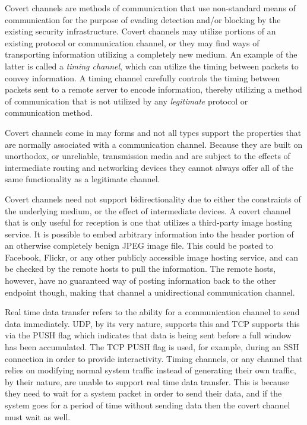 \documentclass[12pt]{article}
\theoremstyle{remark}
\theoremstyle{definition}
\theoremstyle{definition}
\theoremstyle{definition}
\begin{document}
Covert channels are methods of communication that use non-standard means of
communication for the purpose of evading detection and/or blocking by the
existing security infrastructure. Covert channels may utilize
portions of an existing protocol or communication channel, or they may find
ways of transporting information utilizing a completely new medium. An example
of the latter is called a \emph{timing channel}, which can utilize the timing
between packets to convey information. A timing channel carefully controls the
timing between packets sent to a remote server to encode information, thereby
utilizing a method of communication that is not utilized by any
\emph{legitimate} protocol or communication method.

Covert channels come in may forms and not all types support the properties that
are normally associated with a communication channel. Because they are built on
unorthodox, or unreliable, transmission media and are subject to the effects of
intermediate routing and networking devices they cannot always offer all of the
same functionality as a legitimate channel.

Covert channels need not support bidirectionality due
to either the constraints of the underlying medium, or the effect of
intermediate devices. A covert channel that is only useful for reception is one
that utilizes a third-party image hosting service. It is possible to embed
arbitrary information into the header portion of an otherwise completely benign
JPEG image file. This could be posted to Facebook, Flickr, or any other
publicly accessible image hosting service, and can be checked by the remote
hosts to pull the information. The remote hosts, however, have no guaranteed
way of posting information back to the other endpoint though, making that
channel a unidirectional communication channel.

Real time data transfer refers to the ability
for a communication channel to send data immediately. UDP, by its very nature,
supports this and TCP supports this via the PUSH flag which indicates that data
is being sent before a full window has been accumulated. The TCP PUSH flag
is used, for example, during an SSH connection in order to provide
interactivity. Timing channels, or any channel that relies on modifying normal
system traffic instead of generating their own traffic, by their nature, are
unable to support real time data transfer. This is because they need to wait for
a system packet in order to send their data, and if the system goes for a period
of time without sending data then the covert channel must wait as well.
\end{document}
